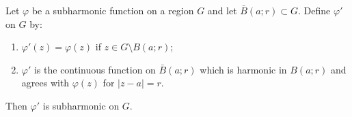 Let $\varphi$ be a subharmonic function on a region $G$ and let $\bar{B}(a; r) \subset G$. Define $\varphi'$ on $G$ by:
\begin{enumerate}
\item[(i)] $\varphi'(z) = \varphi(z)$ if $z \in G \setminus B(a; r)$;
\item[(ii)] $\varphi'$ is the continuous function on $\bar{B}(a; r)$ which is harmonic in $B(a; r)$ and agrees with $\varphi(z)$ for $|z - a| = r$.
\end{enumerate}
Then $\varphi'$ is subharmonic on $G$.
